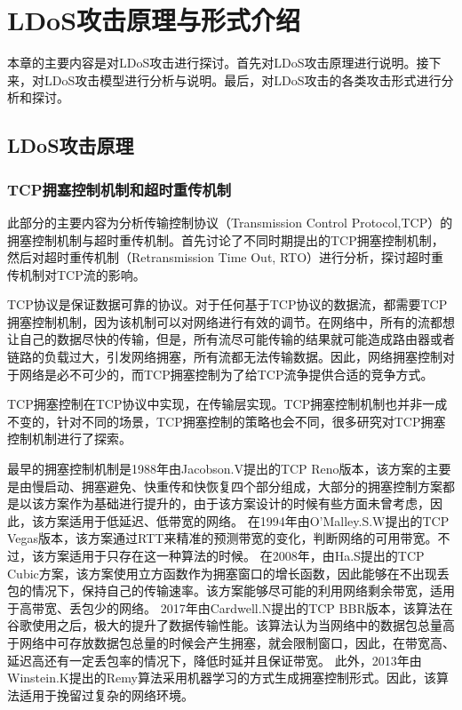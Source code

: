 \chapter{LDoS攻击原理与形式介绍}
\label{cha:LDoS}

本章的主要内容是对LDoS攻击进行探讨。首先对LDoS攻击原理进行说明。接下来，对LDoS攻击模型进行分析与说明。最后，对LDoS攻击的各类攻击形式进行分析和探讨。

\section{LDoS攻击原理}
\label{chap3:LDoSstate}

\subsection{TCP拥塞控制机制和超时重传机制}

此部分的主要内容为分析传输控制协议（Transmission Control Protocol,TCP）的拥塞控制机制与超时重传机制。首先讨论了不同时期提出的TCP拥塞控制机制，然后对超时重传机制（Retransmission Time Out, RTO）进行分析，探讨超时重传机制对TCP流的影响。

TCP协议是保证数据可靠的协议。对于任何基于TCP协议的数据流，都需要TCP拥塞控制机制，因为该机制可以对网络进行有效的调节。在网络中，所有的流都想让自己的数据尽快的传输，但是，所有流尽可能传输的结果就可能造成路由器或者链路的负载过大，引发网络拥塞，所有流都无法传输数据。因此，网络拥塞控制对于网络是必不可少的，而TCP拥塞控制为了给TCP流争提供合适的竞争方式。

TCP拥塞控制在TCP协议中实现，在传输层实现。TCP拥塞控制机制也并非一成不变的，针对不同的场景，TCP拥塞控制的策略也会不同，很多研究对TCP拥塞控制机制进行了探索。

最早的拥塞控制机制是1988年由Jacobson.V\cite{Jacobson1988Congestion}提出的TCP Reno版本，该方案的主要是由慢启动、拥塞避免、快重传和快恢复四个部分组成，大部分的拥塞控制方案都是以该方案作为基础进行提升的，由于该方案设计的时候有些方面未曾考虑，因此，该方案适用于低延迟、低带宽的网络。
在1994年由O’Malley.S.W\cite{O1994TCP}提出的TCP Vegas版本，该方案通过RTT来精准的预测带宽的变化，判断网络的可用带宽。不过，该方案适用于只存在这一种算法的时候。
在2008年，由Ha.S\cite{Ha2008CUBIC}提出的TCP Cubic方案，该方案使用立方函数作为拥塞窗口的增长函数，因此能够在不出现丢包的情况下，保持自己的传输速率。该方案能够尽可能的利用网络剩余带宽，适用于高带宽、丢包少的网络。
2017年由Cardwell.N\cite{Cardwell2017BBR}提出的TCP BBR版本，该算法在谷歌使用之后，极大的提升了数据传输性能。该算法认为当网络中的数据包总量高于网络中可存放数据包总量的时候会产生拥塞，就会限制窗口，因此，在带宽高、延迟高还有一定丢包率的情况下，降低时延并且保证带宽。
此外，2013年由Winstein.K\cite{Winstein2013Remy}提出的Remy算法采用机器学习的方式生成拥塞控制形式。因此，该算法适用于挽留过复杂的网络环境。

